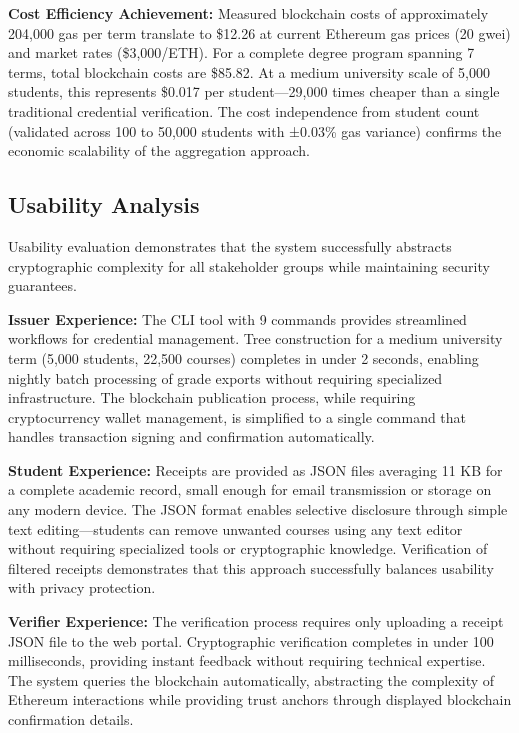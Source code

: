 \textbf{Cost Efficiency Achievement:} Measured blockchain costs of approximately 204,000 gas per term translate to \$12.26 at current Ethereum gas prices (20 gwei) and market rates (\$3,000/ETH). For a complete degree program spanning 7 terms, total blockchain costs are \$85.82. At a medium university scale of 5,000 students, this represents \$0.017 per student—29,000 times cheaper than a single traditional credential verification. The cost independence from student count (validated across 100 to 50,000 students with ±0.03\% gas variance) confirms the economic scalability of the aggregation approach.

\subsection{Usability Analysis}
\label{subsec:usability-analysis}

Usability evaluation demonstrates that the system successfully abstracts cryptographic complexity for all stakeholder groups while maintaining security guarantees.

\textbf{Issuer Experience:} The CLI tool with 9 commands provides streamlined workflows for credential management. Tree construction for a medium university term (5,000 students, 22,500 courses) completes in under 2 seconds, enabling nightly batch processing of grade exports without requiring specialized infrastructure. The blockchain publication process, while requiring cryptocurrency wallet management, is simplified to a single command that handles transaction signing and confirmation automatically.

\textbf{Student Experience:} Receipts are provided as JSON files averaging 11 KB for a complete academic record, small enough for email transmission or storage on any modern device. The JSON format enables selective disclosure through simple text editing—students can remove unwanted courses using any text editor without requiring specialized tools or cryptographic knowledge. Verification of filtered receipts demonstrates that this approach successfully balances usability with privacy protection.

\textbf{Verifier Experience:} The verification process requires only uploading a receipt JSON file to the web portal. Cryptographic verification completes in under 100 milliseconds, providing instant feedback without requiring technical expertise. The system queries the blockchain automatically, abstracting the complexity of Ethereum interactions while providing trust anchors through displayed blockchain confirmation details.

